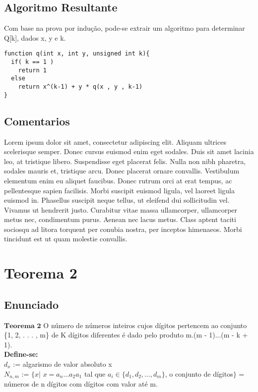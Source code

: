 \documentclass[twoside]{article}
\begin{document}
\begin{multicols}{2}
\subsection{ Algoritmo Resultante }
\indent Com base na prova por indução, pode-se extrair um algoritmo para determinar Q[k], dados x, y e k.
\begin{lstlisting}
function q(int x, int y, unsigned int k){
  if( k == 1 )
    return 1
  else
    return x^(k-1) + y * q(x , y , k-1)  
}
\end{lstlisting}

\subsection{ Comentarios }
\indent Lorem ipsum dolor sit amet, consectetur adipiscing elit. Aliquam ultrices scelerisque semper. Donec cursus euismod enim eget sodales. Duis sit amet lacinia leo, at tristique libero. Suspendisse eget placerat felis. Nulla non nibh pharetra, sodales mauris et, tristique arcu. Donec placerat ornare convallis. Vestibulum elementum enim eu aliquet faucibus. Donec rutrum orci at erat tempus, ac pellentesque sapien facilisis. Morbi suscipit euismod ligula, vel laoreet ligula euismod in. Phasellus suscipit neque tellus, ut eleifend dui sollicitudin vel. Vivamus ut hendrerit justo. Curabitur vitae massa ullamcorper, ullamcorper metus nec, condimentum purus. Aenean nec lacus metus. Class aptent taciti sociosqu ad litora torquent per conubia nostra, per inceptos himenaeos. Morbi tincidunt est ut quam molestie convallis.



\section{Teorema 2}

\subsection{ Enunciado }
\indent $\mathbf{Teorema}$ $\mathbf{2}$ O número de números inteiros cujos dígitos pertencem ao conjunto \{1, 2, . . . , m\} de
K dígitos diferentes é dado pelo produto m.(m - 1)...(m - k + 1).\\

\textbf{Define-se:}\\
$d_x$ := algarismo de valor absoluto x\\
$N_{n,m}$ := $\{ x | $ $x=a_n \dots a_2a_1$ tal que $a_i \in \{d_1,d_2, \dots ,d_m\}$, o conjunto de dígitos$\}$ = números de n dígitos com dígitos com valor até m.\\


\end{multicols}
\end{document}
